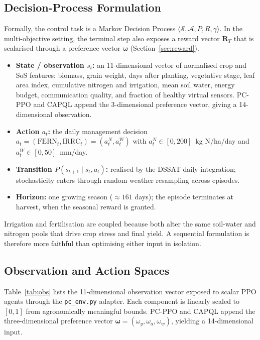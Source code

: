 \subsection{Decision-Process Formulation}

Formally, the control task is a Markov Decision Process
$\langle \mathcal{S}, \mathcal{A}, P, R, \gamma \rangle$. In the
multi-objective setting, the terminal step also exposes a reward vector
$\mathbf{R}_T$ that is scalarised through a preference vector
$\boldsymbol{\omega}$ (Section~\ref{sec:reward}).

\begin{itemize}
  \item \textbf{State / observation $s_t$:} an 11-dimensional vector of
        normalised crop and SoS features: biomass, grain weight, days after
        planting, vegetative stage, leaf area index, cumulative nitrogen and
        irrigation, mean soil water, energy budget, communication quality, and
        fraction of healthy virtual sensors. PC-PPO and CAPQL append the
        3-dimensional preference vector, giving a 14-dimensional observation.
  \item \textbf{Action $a_t$:} the daily management decision
        $a_t = (\mathrm{FERN}_t, \mathrm{IRRC}_t) = (a_t^{N}, a_t^{W})$ with
        $a_t^{N}\in[0,200]$~kg N/ha/day and $a_t^{W}\in[0,50]$~mm/day.
  \item \textbf{Transition $P(s_{t+1}\mid s_t,a_t)$:} realised by the DSSAT
        daily integration; stochasticity enters through random weather resampling
        across episodes.
  \item \textbf{Horizon:} one growing season (${\approx}161$ days); the episode
        terminates at harvest, when the seasonal reward is granted.
\end{itemize}

Irrigation and fertilisation are coupled because both alter the same soil-water
and nitrogen pools that drive crop stress and final yield. A sequential
formulation is therefore more faithful than optimising either input in isolation.


\subsection{Observation and Action Spaces}

Table~\ref{tab:obs} lists the 11-dimensional observation vector exposed to
scalar PPO agents through the \texttt{pc\_env.py} adapter. Each component is
linearly scaled to $[0,1]$ from agronomically meaningful bounds. PC-PPO and
CAPQL append the three-dimensional preference vector
$\boldsymbol{\omega}=(\omega_y,\omega_a,\omega_w)$, yielding a
14-dimensional input.

